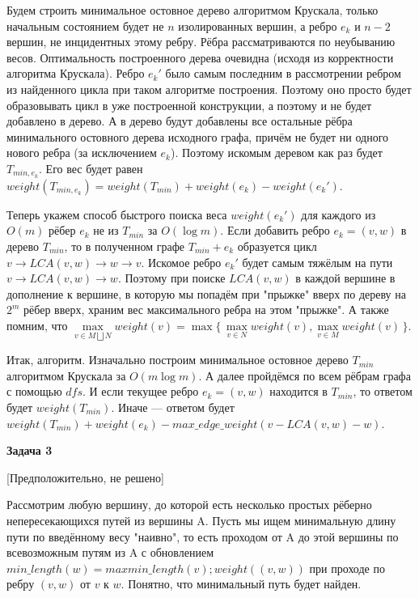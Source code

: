 \documentclass[12pt]{article}
\begin{document}
	Будем строить минимальное остовное дерево алгоритмом Крускала, только начальным состоянием будет не $ n $ изолированных вершин, а ребро $ e_k $ и $ n - 2 $ вершин, не инцидентных этому ребру. Рёбра рассматриваются по неубыванию весов. Оптимальность построенного дерева очевидна (исходя из корректности алгоритма Крускала). Ребро $ e_k' $ было самым последним в рассмотрении ребром из найденного цикла при таком алгоритме построения. Поэтому оно просто будет образовывать цикл в уже построенной конструкции, а поэтому и не будет добавлено в дерево. А в дерево будут добавлены все остальные рёбра минимального остовного дерева исходного графа, причём не будет ни одного нового ребра (за исключением $ e_k $). Поэтому искомым деревом как раз будет $ T_{min, e_k} $. Его вес будет равен $ weight(T_{min, e_k}) = weight(T_{min}) + weight(e_k) - weight(e_k') $.
	
	Теперь укажем способ быстрого поиска веса $ weight(e_k') $ для каждого из $ O(m) $ рёбер $ e_k $ не из $ T_{min} $ за $ O(\log{m}) $. Если добавить ребро $ e_k = (v, w) $ в дерево $ T_{min} $, то в полученном графе $ T_{min} + e_k $ образуется цикл $ v \rightarrow LCA(v, w) \rightarrow w \rightarrow v$. Искомое ребро $ e_k' $ будет самым тяжёлым на пути $v \rightarrow LCA(v, w) \rightarrow w$. Поэтому при поиске $ LCA(v, w) $ в каждой вершине в дополнение к вершине, в которую мы попадём при "прыжке" вверх по дереву на $ 2^m $ рёбер вверх, храним вес максимального ребра на этом "прыжке". А также помним, что $ \max\limits_{v \in M \bigsqcup N} weight(v) = \max { \{\, \max\limits_{v \in N} weight(v), \max\limits_{v \in M} weight(v) \,\}} $.
	\newline
	
	Итак, алгоритм. Изначально построим минимальное остовное дерево $ T_{min} $ алгоритмом Крускала за $ O(m \log{m}) $. А далее пройдёмся по всем рёбрам графа с помощью $ dfs $. И если текущее ребро $ e_k = (v, w) $ находится в $ T_{min} $, то ответом будет $ weight(T_{min}) $. Иначе --- ответом будет $ weight(T_{min}) + weight(e_k) - max\_edge\_weight(v - LCA(v, w) - w) $.
	\newline
	
	\textbf{\large Задача 3}
	
	[Предположительно, не решено]
	\newline
	
	Рассмотрим любую вершину, до которой есть несколько простых рёберно непересекающихся путей из вершины A. Пусть мы ищем минимальную длину пути по введённому весу "наивно", то есть проходом от A до этой вершины по всевозможным путям из A с обновлением $ min\_length(w) = max {min\_length(v); weight((v, w))} $ при проходе по ребру $ (v, w) $ от $ v $ к $ w $. Понятно, что минимальный путь будет найден.
	
\end{document}
